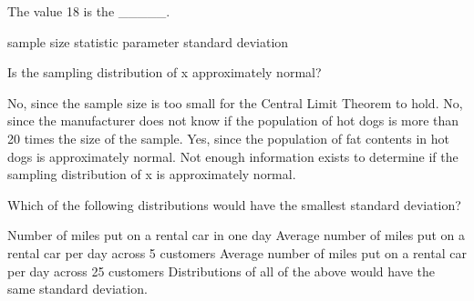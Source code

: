 \documentclass{article}
\begin{document}
\begin{mcquestions}
		\question The value 18 is the \_\_\_\_\_.
		\begin{mcanswerslist}
			\answer sample size
			\answer[correct] statistic
			\answer parameter
			\answer standard deviation
		\end{mcanswerslist}
		
		\question[follow] Is the sampling distribution of x approximately normal?
		\begin{mcanswerslist}
			\answer No, since the sample size is too small for the Central Limit Theorem to hold.
			\answer No, since the manufacturer does not know if the population of hot dogs is more than 20 times the size of the sample.
			\answer[correct] Yes, since the population of fat contents in hot dogs is approximately normal.
			\answer Not enough information exists to determine if the sampling distribution of x is approximately normal.
		\end{mcanswerslist}
		
		\question Which of the following distributions would have the smallest standard deviation?
		\begin{mcanswerslist}
			\answer Number of miles put on a rental car in one day
			\answer Average number of miles put on a rental car per day across 5 customers
			\answer[correct] Average number of miles put on a rental car per day across 25 customers
			\answer Distributions of all of the above would have the same standard deviation.
		\end{mcanswerslist}
		
	\end{mcquestions}
\end{document}
